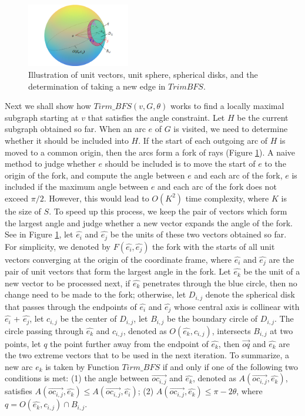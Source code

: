 \begin{figure}[tbp]
  \centering
  \includegraphics[width=0.4\textwidth]{figs/take_arc.png}
  \caption{\label{fig:sphere}%
           Illustration of unit vectors, unit sphere, spherical disks, and the determination of taking a new edge in $TrimBFS$.}
\end{figure}

Next we shall show how $Tirm\_BFS(v, G, \theta)$ works to find a locally maximal subgraph starting at $v$ that satisfies the angle constraint. Let $H$ be the current subgraph obtained so far. When an arc $e$ of $G$ is visited, we need to determine whether it should be included into $H$. If the start of each outgoing arc of $H$ is moved to a common origin, then the arcs form a fork of rays (Figure \ref{fig:sphere}). A naive method to judge whether $e$ should be included is to move the start of $e$ to the origin of the fork, and compute the angle between $e$ and each arc of the fork, $e$ is included if the maximum angle between $e$ and each arc of the fork does not exceed $\pi/2$. However, this would lead to $O(K^{2})$ time complexity, where $K$ is the size of $S$. To speed up this process, we keep the pair of vectors which form the largest angle and judge whether a new vector expands the angle of the fork. See in Figure \ref{fig:sphere}, let $\hat{e_i}$  and $\hat{e_j}$ be the units of these two vectors obtained so far. For simplicity, we denoted by $F( \hat{e_i}, \hat{e_j} )$ the fork with the starts of all unit vectors converging at the origin of the coordinate frame, where $\hat{e_i}$  and  $\hat{e_j}$  are the pair of unit vectors that form the largest angle in the fork. Let $\hat{e_k}$  be the unit of a new vector to be processed next, if $\hat{e_k}$ penetrates through the blue circle, then no change need to be made to the fork; otherwise, let $D_{i,j}$ denote the spherical disk that passes through the endpoints of $\hat{e_i}$  and $\hat{e_j}$ whose central axis is collinear with $\hat{e_i}$  + $\hat{e_j}$, let $c_{i,j}$ be the center of $D_{i,j}$, let $B_{i,j}$ be the boundary circle of $D_{i,j}$. The circle passing through $\hat{e_k}$  and $c_{i,j}$, denoted as $O( \hat{e_k}, c_{i,j})$, intersects  $B_{i,j}$ at two points, let $q$ the point further away from the endpoint of $\hat{e_k}$, then $\overrightarrow{oq}$ and $\hat{e_k}$ are the two extreme vectors that to be used in the next iteration. To summarize, a new arc $e_k$ is taken by Function $Tirm\_BFS$ if and only if one of the following two conditions is met:
(1) the angle between $\overrightarrow{oc_{i,j}}$ and $\hat{e_k}$, denoted as $A(\overrightarrow{oc_{i,j}}, \hat{e_k})$, satisfies  $A(\overrightarrow{oc_{i,j}}, \hat{e_k}) \leq A(\overrightarrow{oc_{i,j}}, \hat{e_i})$;
(2) $A(\overrightarrow{oc_{i,j}}, \hat{e_k})  \leq \pi - 2\theta$, where $q = O( \hat{e_k}, c_{i,j}) \cap B_{i,j}$.


